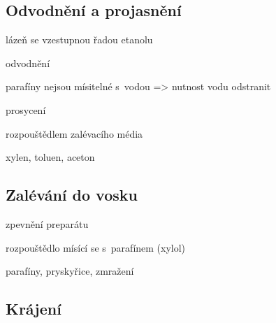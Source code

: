 \documentclass[DIV=8]{scrreprt}
\begin{document}
\subsection{Odvodnění a projasnění} \label{Odvodnění a projasnění}


\begin{myItemize}[nosep]
    \item lázeň se vzestupnou řadou etanolu
    \item odvodnění
\begin{myItemize}[nosep]
    \item parafíny nejsou mísitelné s vodou => nutnost vodu odstranit
\end{myItemize}

    \item prosycení
\begin{myItemize}[nosep]
    \item rozpouštědlem zalévacího média
    \item xylen, toluen, aceton
\end{myItemize}

\end{myItemize}



\subsection{Zalévání do vosku} \label{Zalévání do vosku}


\begin{myItemize}[nosep]
    \item zpevnění preparátu
    \item rozpouštědlo mísící se s parafínem (xylol)
    \item parafíny, pryskyřice, zmražení
\end{myItemize}



\subsection{Krájení} \label{Krájení}
\end{document}

